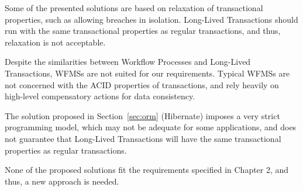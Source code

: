 Some of the presented solutions are based on relaxation of
transactional properties, such as allowing breaches in
isolation. Long-Lived Transactions should run with the same
transactional properties as regular transactions, and thus, relaxation
is not acceptable.

Despite the similarities between Workflow Processes and Long-Lived
Transactions, WFMSs are not suited for our requirements. Typical WFMSs
are not concerned with the ACID properties of transactions, and rely
heavily on high-level compensatory actions for data consistency.

The solution proposed in Section~\ref{sec:orm} (Hibernate) imposes a
very strict programming model, which may not be adequate for some
applications, and does not guarantee that Long-Lived Transactions will
have the same transactional properties as regular transactions.

None of the proposed solutions fit the requirements specified in
Chapter 2, and thus, a new approach is needed.
